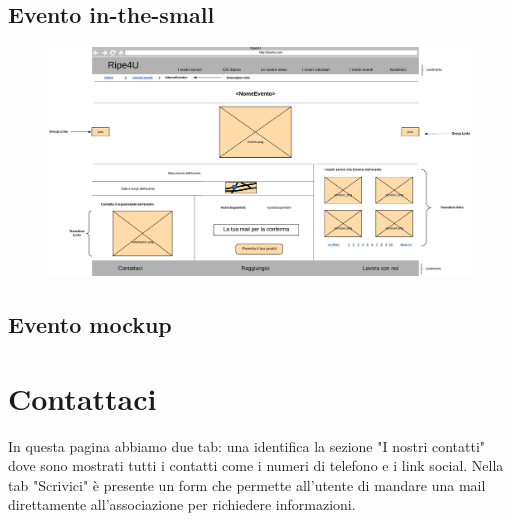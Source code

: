         \subsection{Evento in-the-small}
        \begin{figure}[H]
            \centering
            \includegraphics[scale=0.37]{resources/images/evento-in-the-small.jpg}
        \end{figure}

        \subsection{Evento mockup}

    \section{Contattaci}
    In questa pagina abbiamo due tab: una identifica la sezione "I nostri
    contatti" dove sono mostrati tutti i contatti come i numeri di telefono e i
    link social. Nella tab "Scrivici" è presente un form che permette all'utente
    di mandare una mail direttamente all'associazione per richiedere
    informazioni.

